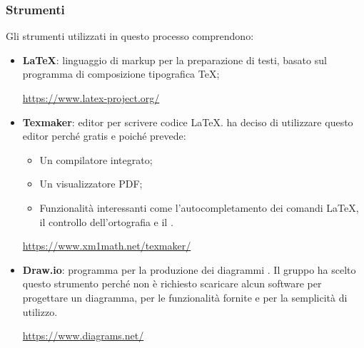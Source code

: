 \subsubsection{Strumenti}
Gli strumenti utilizzati in questo processo comprendono:
\begin{itemize}
	\item \textbf{\LaTeX{}}: linguaggio di markup per la preparazione di testi, basato sul programma di composizione tipografica \TeX{};
	\begin{center}
		\textcolor{blue}{\url{https://www.latex-project.org/}}
	\end{center}
	\item \textbf{Texmaker}: editor per scrivere codice \LaTeX{}. \Gruppo{} ha deciso di utilizzare questo editor perché gratis e poiché prevede:
\begin{itemize}
	\item Un compilatore integrato;
	\item Un visualizzatore PDF;
	\item Funzionalità interessanti come l'autocompletamento dei comandi \LaTeX{}, il controllo dell'ortografia e il .
\end{itemize}	
	\begin{center}
		\textcolor{blue}{\url{https://www.xm1math.net/texmaker/}}
	\end{center}
	\item \textbf{Draw.io}: programma per la produzione dei diagrammi . Il gruppo ha scelto questo strumento perché non è richiesto scaricare alcun software per progettare un diagramma, per le funzionalità fornite e per la semplicità di utilizzo.
	\begin{center}
		\textcolor{blue}{\url{https://www.diagrams.net/}}
	\end{center}
\end{itemize}